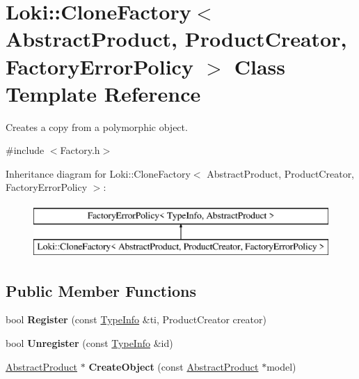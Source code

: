 \hypertarget{classLoki_1_1CloneFactory}{}\section{Loki\+:\+:Clone\+Factory$<$ Abstract\+Product, Product\+Creator, Factory\+Error\+Policy $>$ Class Template Reference}
\label{classLoki_1_1CloneFactory}


Creates a copy from a polymorphic object.  




{\ttfamily \#include $<$Factory.\+h$>$}

Inheritance diagram for Loki\+:\+:Clone\+Factory$<$ Abstract\+Product, Product\+Creator, Factory\+Error\+Policy $>$\+:\begin{figure}[H]
\begin{center}
\leavevmode
\includegraphics[height=2.000000cm]{classLoki_1_1CloneFactory}
\end{center}
\end{figure}
\subsection*{Public Member Functions}
\begin{DoxyCompactItemize}
\item 
\hypertarget{classLoki_1_1CloneFactory_a426b5bf94df23e5fc66d6cd1d5b52d3c}{}bool {\bfseries Register} (const \hyperlink{classLoki_1_1TypeInfo}{Type\+Info} \&ti, Product\+Creator creator)\label{classLoki_1_1CloneFactory_a426b5bf94df23e5fc66d6cd1d5b52d3c}

\item 
\hypertarget{classLoki_1_1CloneFactory_a27e4a3044b3c00b342de845f7f458021}{}bool {\bfseries Unregister} (const \hyperlink{classLoki_1_1TypeInfo}{Type\+Info} \&id)\label{classLoki_1_1CloneFactory_a27e4a3044b3c00b342de845f7f458021}

\item 
\hypertarget{classLoki_1_1CloneFactory_a2164f990b4cfc933ffd43ea3f4e5d4d6}{}\hyperlink{classAbstractProduct}{Abstract\+Product} $\ast$ {\bfseries Create\+Object} (const \hyperlink{classAbstractProduct}{Abstract\+Product} $\ast$model)\label{classLoki_1_1CloneFactory_a2164f990b4cfc933ffd43ea3f4e5d4d6}

\end{DoxyCompactItemize}


